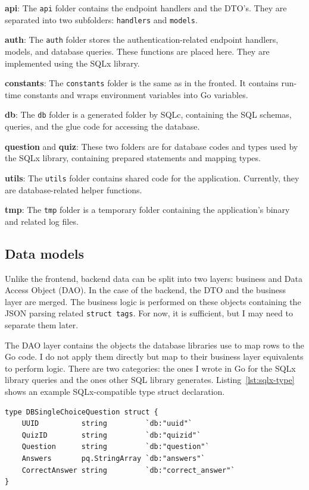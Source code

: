 \textbf{api}: The \texttt{api} folder contains the endpoint handlers and the DTO's. They are separated into two subfolders: \texttt{handlers} and \texttt{models}.

\textbf{auth}: The \texttt{auth} folder stores the authentication-related endpoint handlers, models, and database queries. These functions are placed here. They are implemented using the SQLx library.

\textbf{constants}: The \texttt{constants} folder is the same as in the fronted. It contains run-time constants and wraps environment variables into Go variables.

\textbf{db}: The \texttt{db} folder is a generated folder by SQLc, containing the SQL schemas, queries, and the glue code for accessing the database.

\textbf{question} and \textbf{quiz}: These two folders are for database codes and types used by the SQLx library, containing prepared statements and mapping types.

\textbf{utils}: The \texttt{utils} folder contains shared code for the application. Currently, they are database-related helper functions.

\textbf{tmp}: The \texttt{tmp} folder is a temporary folder containing the application's binary and related log files.

\subsection{Data models}

Unlike the frontend, backend data can be split into two layers: business and Data Access Object (DAO). In the case of the backend, the DTO and the business layer are merged. The business logic is performed on these objects containing the JSON parsing related \texttt{struct tags}. For now, it is sufficient, but I may need to separate them later.

The DAO layer contains the objects the database libraries use to map rows to the Go code. I do not apply them directly but map to their business layer equivalents to perform logic. There are two categories: the ones I wrote in Go for the SQLx library queries and the ones other SQL library generates. Listing~\ref{lst:sqlx-type} shows an example SQLx-compatible type struct declaration.

\begin{lstlisting}[caption=SQLx-compatible type struct declaration,label=lst:sqlx-type]
type DBSingleChoiceQuestion struct {
    UUID          string         `db:"uuid"`
    QuizID        string         `db:"quizid"`
    Question      string         `db:"question"`
    Answers       pq.StringArray `db:"answers"`
    CorrectAnswer string         `db:"correct_answer"`
}
\end{lstlisting}

